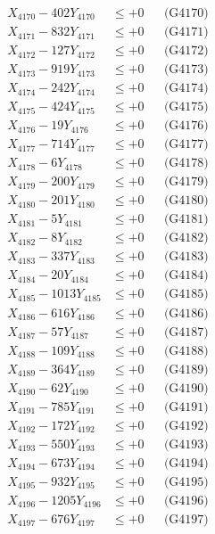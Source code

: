 \documentclass[a4paper,10pt]{article}
\begin{document}
{\begin{align}
X_{4170} - 402Y_{4170} &\leq +0 && \text{(G4170)} \\
\allowbreak
X_{4171} - 832Y_{4171} &\leq +0 && \text{(G4171)} \\
X_{4172} - 127Y_{4172} &\leq +0 && \text{(G4172)} \\
X_{4173} - 919Y_{4173} &\leq +0 && \text{(G4173)} \\
X_{4174} - 242Y_{4174} &\leq +0 && \text{(G4174)} \\
X_{4175} - 424Y_{4175} &\leq +0 && \text{(G4175)} \\
X_{4176} - 19Y_{4176} &\leq +0 && \text{(G4176)} \\
X_{4177} - 714Y_{4177} &\leq +0 && \text{(G4177)} \\
X_{4178} - 6Y_{4178} &\leq +0 && \text{(G4178)} \\
X_{4179} - 200Y_{4179} &\leq +0 && \text{(G4179)} \\
X_{4180} - 201Y_{4180} &\leq +0 && \text{(G4180)} \\
\allowbreak
X_{4181} - 5Y_{4181} &\leq +0 && \text{(G4181)} \\
X_{4182} - 8Y_{4182} &\leq +0 && \text{(G4182)} \\
X_{4183} - 337Y_{4183} &\leq +0 && \text{(G4183)} \\
X_{4184} - 20Y_{4184} &\leq +0 && \text{(G4184)} \\
X_{4185} - 1013Y_{4185} &\leq +0 && \text{(G4185)} \\
X_{4186} - 616Y_{4186} &\leq +0 && \text{(G4186)} \\
X_{4187} - 57Y_{4187} &\leq +0 && \text{(G4187)} \\
X_{4188} - 109Y_{4188} &\leq +0 && \text{(G4188)} \\
X_{4189} - 364Y_{4189} &\leq +0 && \text{(G4189)} \\
X_{4190} - 62Y_{4190} &\leq +0 && \text{(G4190)} \\
\allowbreak
X_{4191} - 785Y_{4191} &\leq +0 && \text{(G4191)} \\
X_{4192} - 172Y_{4192} &\leq +0 && \text{(G4192)} \\
X_{4193} - 550Y_{4193} &\leq +0 && \text{(G4193)} \\
X_{4194} - 673Y_{4194} &\leq +0 && \text{(G4194)} \\
X_{4195} - 932Y_{4195} &\leq +0 && \text{(G4195)} \\
X_{4196} - 1205Y_{4196} &\leq +0 && \text{(G4196)} \\
X_{4197} - 676Y_{4197} &\leq +0 && \text{(G4197)} \\

\end{align}}
\end{document}
